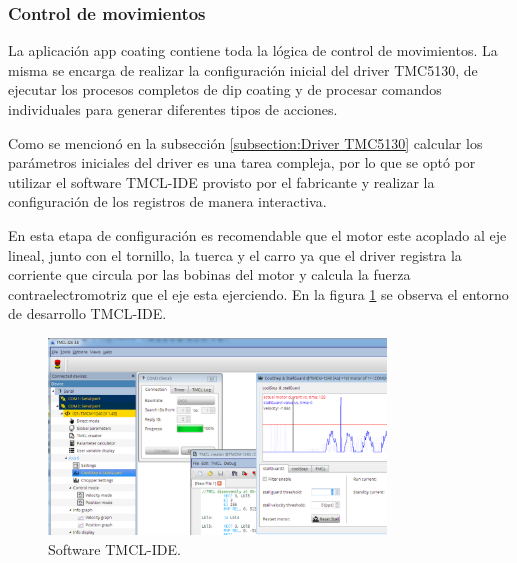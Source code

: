 \subsubsection{Control de movimientos}

La aplicación app coating contiene toda la lógica de control de movimientos. La misma se encarga de realizar la configuración inicial del driver TMC5130, de ejecutar los procesos completos de dip coating y de procesar comandos individuales para generar diferentes tipos de acciones. 

Como se mencionó en la subsección \ref{subsection:Driver TMC5130} calcular los parámetros iniciales del driver es una tarea compleja, por lo que se optó por utilizar el software TMCL-IDE provisto por el fabricante y realizar la configuración de los registros de manera interactiva.


En esta etapa de configuración es recomendable que el motor este acoplado al eje lineal, junto con el tornillo, la tuerca y el carro ya que el driver registra la corriente que circula por las bobinas del motor y calcula la fuerza contraelectromotriz que el eje esta ejerciendo. 
En la figura \ref{fig:tmcl_ide} se observa el entorno de desarrollo TMCL-IDE.  

\begin{figure}[h!]
	\centering
	\includegraphics[width=0.8\textwidth]{./Figures/tmcl_ide_1.png}
	\caption{Software TMCL-IDE.}
	\label{fig:tmcl_ide}
\end{figure}


